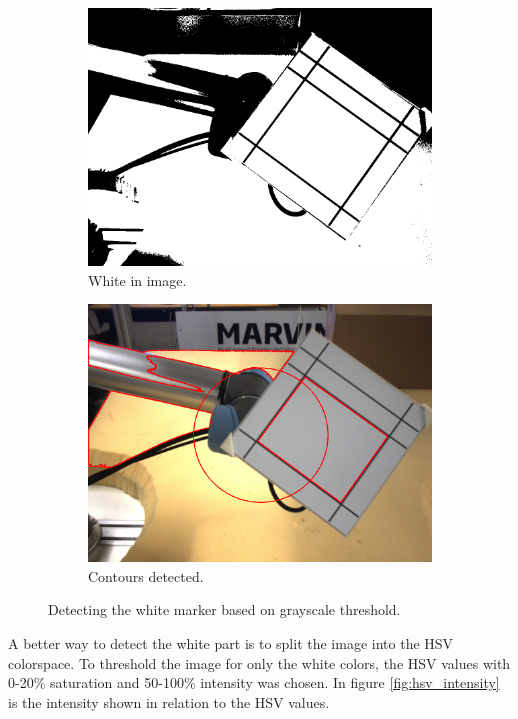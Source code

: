 \begin{figure}[H]
 \centering
 \begin{subfigure}{0.49\linewidth}
 \includegraphics[width=\linewidth]{graphics/threshold_white}
 \caption{White in image.}
 \end{subfigure}
 \begin{subfigure}{0.49\linewidth}
 \includegraphics[width=\linewidth]{graphics/threshold_white_contours}
 \caption{Contours detected.}
 \end{subfigure}
 \caption{Detecting the white marker based on grayscale threshold.}
 \label{fig:threshold_marker1}
\end{figure}

A better way to detect the white part is to split the image into the HSV colorspace.
To threshold the image for only the white colors, the HSV values with 
0-20\% saturation and 50-100\% intensity was chosen.
In figure \ref{fig:hsv_intensity} is the intensity shown in relation to the HSV values.


